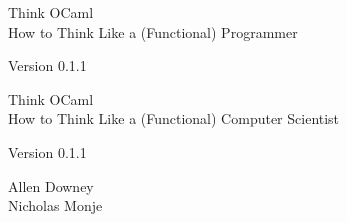 \documentclass[10pt]{book}
\newcommand{\theversion}{0.1.1}
\begin{document}
\frontmatter




\newtheorem{ex}{Exercise}[chapter]

\begin{latexonly}

\renewcommand{\blankpage}{\thispagestyle{empty} \quad \newpage}



\thispagestyle{empty}

\begin{flushright}
\vspace*{2.0in}

\begin{spacing}{3}
{\huge Think OCaml}\\
{\Large How to Think Like a (Functional) Programmer}
\end{spacing}

\vspace{0.25in}

Version \theversion

\vfill

\end{flushright}


\blankpage
\blankpage

\pagebreak
\thispagestyle{empty}

\begin{flushright}
\vspace*{2.0in}

\begin{spacing}{3}
{\huge Think OCaml}\\
{\Large How to Think Like a (Functional) Computer Scientist}
\end{spacing}

\vspace{0.25in}

Version \theversion

\vspace{1in}


{\Large
Allen Downey\\
\large Nicholas Monje\\
}



\end{flushright}
\end{latexonly}
\end{document}
